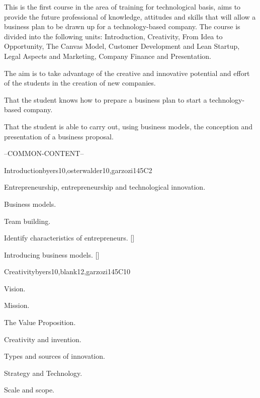 \begin{syllabus}


\begin{justification}
   This is the first course in the area of training for
   technological basis, aims to provide the future professional 
   of knowledge, attitudes and skills that will
   allow a business plan to be drawn up for a technology-based company.
   The course is divided into the following units:
   Introduction, Creativity, From Idea to Opportunity, The Canvas Model, Customer Development and Lean Startup, Legal Aspects and Marketing, Company Finance and Presentation.
   
   The aim is to take advantage of the creative and innovative potential and effort of the students in the creation of new companies.
\end{justification}

\begin{goals}
   \item That the student knows how to prepare a business plan to start a technology-based company.
   \item That the student is able to carry out, using business models, the conception and presentation of a business proposal.
\end{goals}

--COMMON-CONTENT--
   
\begin{unit}{}{Introduction}{byers10,osterwalder10,garzozi14}{5}{C2}
\begin{topics}
    \item Entrepreneurship, entrepreneurship and technological innovation.
    \item Business models.
    \item Team building.
\end{topics}

\begin{learningoutcomes} 
    \item Identify characteristics of entrepreneurs. [\Familiarity]
    \item Introducing business models. [\Familiarity]
\end{learningoutcomes} 
\end{unit}
   
\begin{unit}{}{Creativity}{byers10,blank12,garzozi14}{5}{C10}
    \begin{topics}
      \item Vision.
      \item Mission.
      \item The Value Proposition.
      \item Creativity and invention.
      \item Types and sources of innovation.
      \item Strategy and Technology.
      \item Scale and scope.
    \end{topics}


\end{unit}
\end{syllabus}
